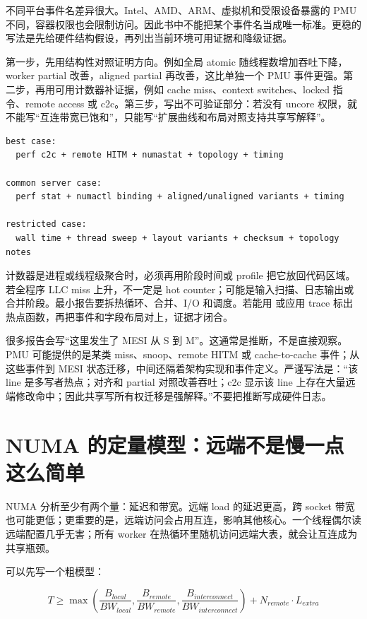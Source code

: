 不同平台事件名差异很大。Intel、AMD、ARM、虚拟机和受限设备暴露的 PMU 不同，容器权限也会限制访问。因此书中不能把某个事件名当成唯一标准。更稳的写法是先给硬件结构假设，再列出当前环境可用证据和降级证据。

第一步，先用结构性对照证明方向。例如全局 atomic 随线程数增加吞吐下降，worker partial 改善，aligned partial 再改善，这比单独一个 PMU 事件更强。第二步，再用可用计数器补证据，例如 cache miss、context switches、locked 指令、remote access 或 c2c。第三步，写出不可验证部分：若没有 uncore 权限，就不能写“互连带宽已饱和”，只能写“扩展曲线和布局对照支持共享写解释”。

\begin{lstlisting}[numbers=none,caption={NUMA/coherence 报告的指标降级路径}]
best case:
  perf c2c + remote HITM + numastat + topology + timing

common server case:
  perf stat + numactl binding + aligned/unaligned variants + timing

restricted case:
  wall time + thread sweep + layout variants + checksum + topology notes
\end{lstlisting}

计数器是进程或线程级聚合时，必须再用阶段时间或 profile 把它放回代码区域。若全程序 LLC miss 上升，不一定是 hot counter；可能是输入扫描、日志输出或合并阶段。最小报告要拆热循环、合并、I/O 和调度。若能用  或应用 trace 标出热点函数，再把事件和字段布局对上，证据才闭合。

很多报告会写“这里发生了 MESI 从 S 到 M”。这通常是推断，不是直接观察。PMU 可能提供的是某类 miss、snoop、remote HITM 或 cache-to-cache 事件；从这些事件到 MESI 状态迁移，中间还隔着架构实现和事件定义。严谨写法是：“该 line 是多写者热点；对齐和 partial 对照改善吞吐；c2c 显示该 line 上存在大量远端修改命中；因此共享写所有权迁移是强解释。”不要把推断写成硬件日志。

\section{NUMA 的定量模型：远端不是慢一点这么简单}

NUMA 分析至少有两个量：延迟和带宽。远端 load 的延迟更高，跨 socket 带宽也可能更低；更重要的是，远端访问会占用互连，影响其他核心。一个线程偶尔读远端配置几乎无害；所有 worker 在热循环里随机访问远端大表，就会让互连成为共享瓶颈。

可以先写一个粗模型：

\[
T \ge \max\left(
\frac{B_{local}}{BW_{local}},
\frac{B_{remote}}{BW_{remote}},
\frac{B_{interconnect}}{BW_{interconnect}}
\right) + N_{remote}\cdot L_{extra}
\]

